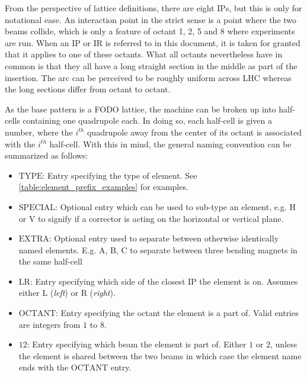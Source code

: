 From the perspective of lattice definitions, there are eight $\mathrm{IP}$s, but this is only for notational ease.
An interaction point in the strict sense is a point where the two beams collide, which is only a feature of octant 1, 2, 5 and 8 where experiments are run.
When an $\mathrm{IP}$ or $\mathrm{IR}$ is referred to in this document, it is taken for granted that it applies to one of these octants.
What all octants nevertheless have in common is that they all have a long straight section in the middle as part of the insertion.
The arc can be perceived to be roughly uniform across LHC whereas the long sections differ from octant to octant.


As the base pattern is a FODO lattice, the machine can be broken up into half-cells containing one quadrupole each.
In doing so, each half-cell is given a number, where the $i^{th}$ quadrupole away from the center of its octant is associated with the $i^{th}$ half-cell.
With this in mind, the general naming convention can be summarized as follows:


\begin{itemize}
    \item $\mathrm{TYPE}$: Entry specifying the type of element. See \cref{table:element_prefix_examples} for examples.
    \item $\mathrm{SPECIAL}$: Optional entry which can be used to sub-type an element, e.g. $\mathrm{H}$ or $\mathrm{V}$ to signify if a corrector is acting on the horizontal or vertical plane.
    \item $\mathrm{EXTRA}$: Optional entry used to separate between otherwise identically named elements. E.g. $\mathrm{A}$, $\mathrm{B}$, $\mathrm{C}$ to separate between three bending magnets in the same half-cell
    \item $\mathrm{LR}$: Entry specifying which side of the closest $\mathrm{IP}$ the element is on. Assumes either $\mathrm{L}$ (\textit{left}) or $\mathrm{R}$ (\textit{right}).
    \item $\mathrm{OCTANT}$: Entry specifying the octant the element is a part of. Valid entries are integers from $1$ to $8$.
    \item $\mathrm{12}$: Entry specifying which beam the element is part of. Either $1$ or $2$, unless the element is shared between the two beams in which case the element name ends with the $\mathrm{OCTANT}$ entry.
\end{itemize}

